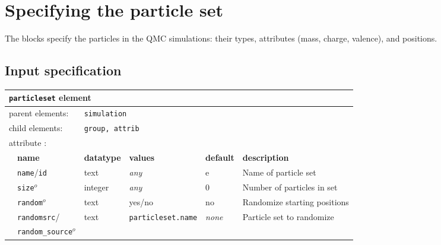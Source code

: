 \section{Specifying the particle set}
\label{sec:particleset}


The  blocks specify the particles in the QMC simulations: their types, attributes (mass, charge, valence), and positions.   

\subsection{Input specification}
\begin{table}[h]
\begin{center}
\begin{tabularx}{\textwidth}{l l l l l l }
\hline
\multicolumn{6}{l}{\texttt{particleset} element} \\
\hline
\multicolumn{2}{l}{parent elements:} & \multicolumn{4}{l}{\texttt{simulation}}\\
\multicolumn{2}{l}{child  elements:} & \multicolumn{4}{l}{\texttt{group, attrib}}\\
\multicolumn{2}{l}{attribute      :} & \multicolumn{4}{l}{}\\
   &   \bfseries name            & \bfseries datatype & \bfseries values & \bfseries default   & \bfseries description \\
   &   \texttt{name}/\texttt{id}   &  text              &  \textit{any}    &  e                & Name of particle set  \\
   &   \texttt{size}$^o$           &  integer           &  \textit{any}    &  0                & Number of particles in set \\
   &   \texttt{random}$^o$         &  text              &  yes/no          &  no               & Randomize starting positions \\
   &   \texttt{randomsrc}/         &  text     & \texttt{particleset.name} & \textit{none}     & Particle set to randomize  \\
   &   \texttt{random\_source}$^o$ &                    &                  &                   &                       \\
  \hline
\end{tabularx}
\end{center}
\end{table}

